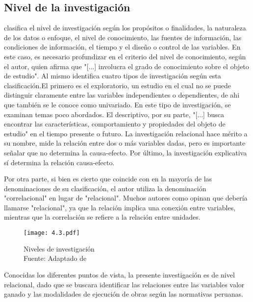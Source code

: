 \subsection{Nivel de la investigación} \label{nivel_invest}

\cite[88]{RiosRamirez2017} clasifica el nivel de investigación según los propósitos o finalidades, la naturaleza de los datos o enfoque, el nivel de conocimiento, las fuentes de información, las condiciones de información, el tiempo y el diseño o control de las variables. En este caso, es necesario profundizar en el criterio del nivel de conocimiento, según el autor, quien afirma que "[...] involucra el grado de conocimiento sobre el objeto de estudio". Al mismo identifica cuatro tipos de investigación según esta clasificación.El primero es el exploratorio, un estudio en el cual no se puede distinguir claramente entre las variables independientes o dependientes, de ahi que también se le conoce como univariado. En este tipo de investigación, se examinan temas poco abordados. El descriptivo, por su parte, "[...] busca encontrar las características, comportamiento y propiedades del objeto de estudio" en el tiempo presente o futuro. La investigación relacional hace mérito a su nombre, mide la relación entre dos o más variables dadas, pero es importante señalar que no determina la causa-efecto. Por último, la investigación explicativa sí determina la relación causa-efecto.

Por otra parte, si bien es cierto que \cite[93]{HernandezSampieri2014} coincide con \citeauthor{RiosRamirez2017} en la mayoría de las denominaciones de su clasificación, el autor utiliza la denominación "correlacional" en lugar de "relacional". Muchos autores como \cite[]{Zacarias2020} opinan que debería llamarse "relacional", ya que la relación implica una conexión entre variables, mientras que la correlación se refiere a la relación entre unidades.

\begin{figure}[ht]
\captionsetup{width=0.95\textwidth}
\centering
\texttt{[image: 4.3.pdf]}
\caption[Niveles de investigación]{Niveles de investigación \\ Fuente: Adaptado de \citeauthor[]{Zacarias2020}}
\label{fig:niv_inv}
\end{figure}

Conocidas los diferentes puntos de vista, la presente investigación es de nivel relacional, dado que se buscara identificar las relaciones entre las variables valor ganado y las modalidades de ejecución de obras según las normativas peruanas.

